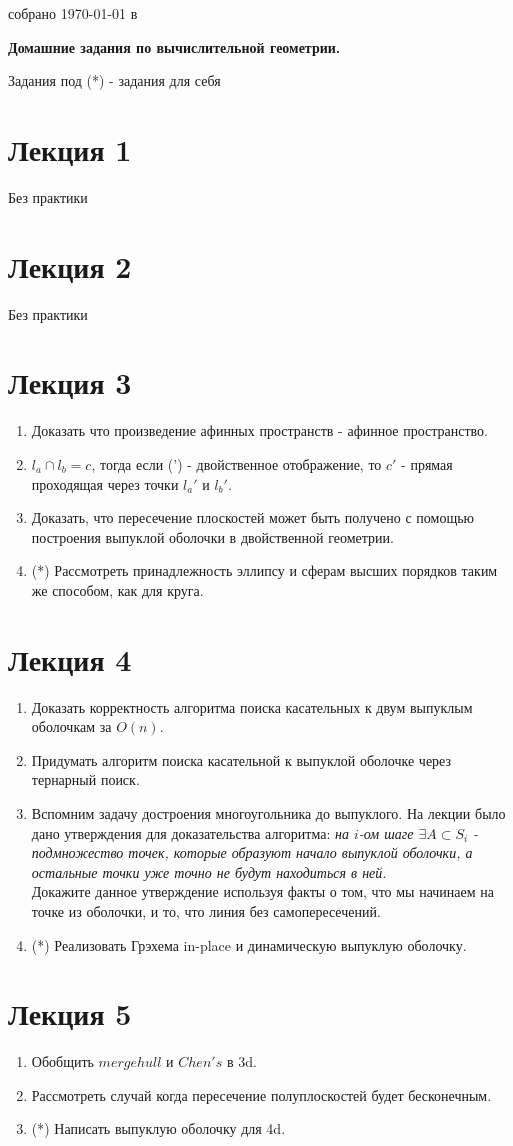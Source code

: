 \documentclass[12pt,a4paper,oneside]{article}
\begin{document}
\begin{flushright}

	{\large собрано {\today} в {\currenttime}}

\end{flushright}

\begin{center}
	{\Large \bf Домашние задания по вычислительной геометрии.}
\end{center}

Задания под (*) - задания для себя
\section*{Лекция 1}
	Без практики

\section*{Лекция 2}
	Без практики

\section*{Лекция 3}
	\begin{enumerate}
		\item Доказать что произведение афинных пространств - афинное пространство.
		\item $l_a\cap l_b = c$, тогда если (') - двойственное отображение, то $c'$ - прямая проходящая через точки $l_a'$ и $l_b'$.
		\item Доказать, что пересечение плоскостей может быть получено с помощью построения выпуклой оболочки в двойственной геометрии.
		\item (*) Рассмотреть принадлежность эллипсу и сферам высших порядков таким же способом, как для круга.
	\end{enumerate}
\section*{Лекция 4}
	\begin{enumerate}
		\item Доказать корректность алгоритма поиска касательных к двум выпуклым оболочкам за $O(n)$.
		\item Придумать алгоритм поиска касательной к выпуклой оболочке через тернарный поиск.
		\item Вспомним задачу достроения многоугольника до выпуклого. На лекции было дано утверждения для доказательства алгоритма: \textit{на $i$-ом шаге $\exists A \subset S_i$ - подмножество точек, которые образуют начало выпуклой оболочки, а остальные точки уже точно не будут находиться в ней.} \\
		Докажите данное утверждение используя факты о том, что мы начинаем на точке из оболочки, и то, что линия без самопересечений.
		\item (*) Реализовать Грэхема in-place и динамическую выпуклую оболочку.
	\end{enumerate}
\section*{Лекция 5}
	\begin{enumerate}
		\item Обобщить $mergehull$ и $Chen's$ в 3d.
		\item Рассмотреть случай когда пересечение полуплоскостей будет бесконечным.
		\item (*) Написать выпуклую оболочку для 4d.
	\end{enumerate}
\end{document}
